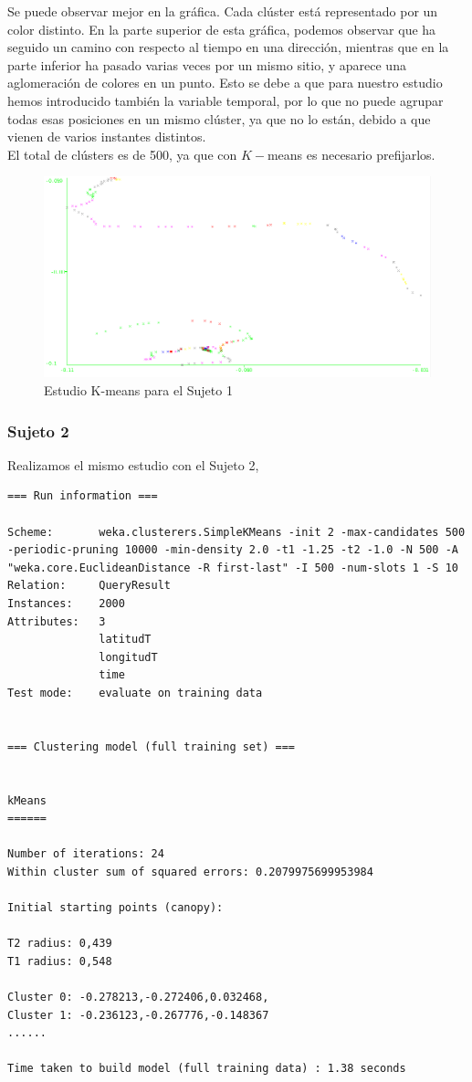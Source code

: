 \documentclass[a4paper, 12pt]{article}
\begin{document}
Se puede observar mejor en la gr\'afica. Cada cl\'uster est\'a representado por un color distinto. En la parte superior de esta gr\'afica, podemos observar que ha seguido un camino con respecto al tiempo en una direcci\'on, mientras que en la parte inferior ha pasado varias veces por un mismo sitio, y aparece una aglomeraci\'on de colores en un punto. Esto se debe a que para nuestro estudio hemos introducido tambi\'en la variable temporal, por lo que no puede agrupar todas esas posiciones en un mismo cl\'uster, ya que no lo est\'an, debido a que vienen de varios instantes distintos. \\

El total de cl\'usters es de 500, ya que con $K-$means es necesario prefijarlos.

\begin{figure}[H]
	\includegraphics[scale=.5]{../comparativa/kMeansSujeto1.png}
	\caption{Estudio K-means para el Sujeto 1}
\end{figure}


\subsubsection{Sujeto 2}

Realizamos el mismo estudio con el Sujeto 2,\\

\begin{verbatim}
=== Run information ===

Scheme:       weka.clusterers.SimpleKMeans -init 2 -max-candidates 500 -periodic-pruning 10000 -min-density 2.0 -t1 -1.25 -t2 -1.0 -N 500 -A "weka.core.EuclideanDistance -R first-last" -I 500 -num-slots 1 -S 10
Relation:     QueryResult
Instances:    2000
Attributes:   3
              latitudT
              longitudT
              time
Test mode:    evaluate on training data


=== Clustering model (full training set) ===


kMeans
======

Number of iterations: 24
Within cluster sum of squared errors: 0.2079975699953984

Initial starting points (canopy):

T2 radius: 0,439     
T1 radius: 0,548     

Cluster 0: -0.278213,-0.272406,0.032468,
Cluster 1: -0.236123,-0.267776,-0.148367
......

Time taken to build model (full training data) : 1.38 seconds
\end{verbatim}
\end{document}
